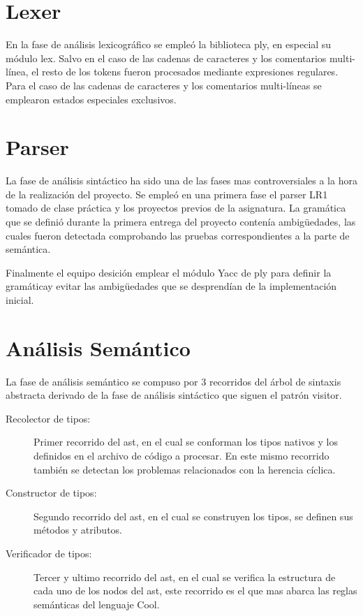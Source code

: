 \documentclass[a4paper,10pt,twocolumn]{article}
\begin{document}



\section{Lexer}\label{sec:dev}
	En la fase de análisis lexicográfico se empleó la biblioteca ply, en especial su módulo lex. 
	Salvo en el caso de las cadenas de caracteres y los comentarios multi-línea, el resto de los tokens fueron procesados mediante expresiones regulares. Para el caso de las cadenas de caracteres y los comentarios multi-líneas se emplearon estados especiales exclusivos. 
	
\section{Parser}
	La fase de análisis sintáctico ha sido una de las fases mas controversiales a la hora de la realización del proyecto. Se empleó en una primera fase el parser LR1 tomado de clase práctica y los proyectos previos de la asignatura. La gramática que se definió durante la primera entrega del proyecto contenía ambigüedades, las cuales fueron detectada comprobando las pruebas correspondientes a la parte de semántica. 
	
	Finalmente el equipo desición emplear el módulo Yacc de ply para definir la gramáticay evitar las ambigüedades que se desprendían de la implementación inicial.
	
	
\section{Análisis Semántico}

	La fase de análisis semántico se compuso por 3 recorridos del árbol de sintaxis abstracta derivado de la fase de análisis sintáctico que siguen el patrón visitor.
	
	\begin{description}
		\item [Recolector de tipos:] Primer recorrido del ast, en el cual se conforman los tipos nativos y los definidos en el archivo de código a procesar. En este mismo recorrido también se detectan los problemas relacionados con la herencia cíclica.
		\item [Constructor de tipos:] Segundo recorrido del ast, en el cual se construyen los tipos, se definen sus métodos y atributos. 
		\item [Verificador de tipos:] Tercer y ultimo recorrido del ast, en el cual se verifica la estructura de cada uno de los nodos del ast, este recorrido es el que mas abarca las reglas semánticas del lenguaje Cool.
	\end{description}
\end{document}

